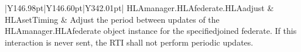 \begin{landscape}
\begin{momtabletypeset}[8.00]
{{\begin{tabular}{|Y{146.98pt}|Y{146.60pt}|Y{342.01pt}|}
                    HLAmanager.\allowbreak{}HLAfederate.\allowbreak{}HLAadjust & HLAsetTiming            & Adjust the period between updates of the HLAmanager.\allowbreak{}HLAfederate object instance for the specified\allowbreak{}joined federate.\allowbreak{} If this interaction is never sent, the RTI shall not perform periodic updates.\allowbreak{}                                                                                                                                                                                                                                                                                                                                                                                                                                                                                                                                                                                                                                                                                                                                                                                                                                                                                                                                                                                                                                                                                                                                                                                                                                                                                                                 \\

\end{tabular}}}
\end{momtabletypeset}
\end{landscape}
